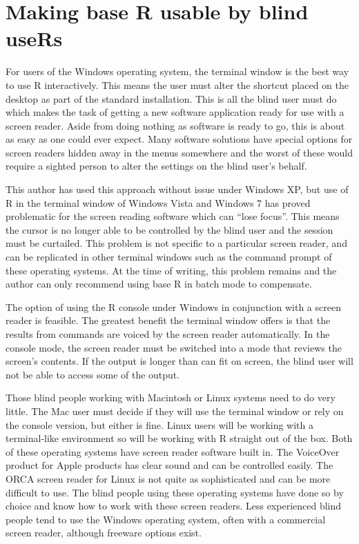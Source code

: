 \section{Making base R usable by blind useRs}



For users of the Windows operating system, the terminal window is the best way to use R interactively. This means the user must alter the shortcut placed on the desktop as part of the standard installation. This is all the blind user must do which makes the task of getting a new software application ready for use with a screen reader. Aside from doing nothing as software is ready to go, this is about as easy as one could ever expect. Many software solutions have special options for screen readers hidden away in the menus somewhere and the worst of these would require a sighted person to alter the settings on the blind user's behalf.

This author has used this approach without issue under Windows XP, but use of R in the terminal window of Windows Vista and Windows 7 has proved problematic for the screen reading software which can ``lose focus''. This means the cursor is no longer able to be controlled by the blind user and the session must be curtailed. This problem is not specific to a particular screen reader, and can be replicated in other terminal windows such as the command prompt of these operating systems. At the time of writing, this problem remains and the author can only recommend using base R in batch mode to compensate. 

The option of using the R console under Windows in conjunction with a screen reader is feasible. The greatest benefit the terminal window offers is that the results from commands are voiced by the screen reader automatically. In the console mode, the screen reader must be switched into a mode that reviews the screen's contents. If the output is longer than can fit on screen, the blind user will not be able to access some of the output.


Those blind people working with Macintosh or Linux systems need to do very little. The Mac user must decide if they will use the terminal window or rely on the console version, but either is fine. Linux users will be working with a terminal-like environment so will be working with R straight out of the box. Both of these operating systems have screen reader software built in. The VoiceOver product for Apple products has clear sound and can be controlled easily. The ORCA screen reader for Linux is not quite as sophisticated and can be more difficult to use. The blind people using these operating systems have done so by choice and know how to work with these screen readers. Less experienced blind people tend to use the Windows operating system, often with a commercial screen reader, although freeware options exist.


